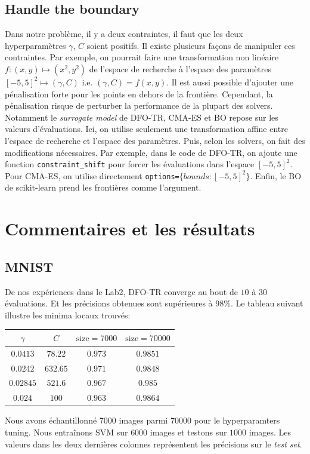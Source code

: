 \documentclass[12 pt, a4paper]{article}
\begin{document}
\subsection{Handle the boundary}
Dans notre problème, il y a deux contraintes, il faut que les deux hyperparamètres $\gamma$, $C$ soient positifs. Il existe plusieurs façons de manipuler ces contraintes. Par exemple, on pourrait faire une transformation non linéaire $f:(x,y) \mapsto (x^2, y^2)$ de l'espace de recherche à l'espace des paramètres $[-5, 5]^2 \mapsto (\gamma, C)$ i.e. $(\gamma, C) = f(x,y)$. Il est aussi possible d'ajouter une pénalisation forte pour les points en dehors de la frontière. Cependant, la pénalisation risque de perturber la performance de la plupart des solvers. Notamment le \textit{surrogate model} de DFO-TR, CMA-ES et BO repose sur les valeurs d'évaluations. Ici, on utilise seulement une transformation affine entre l'espace de recherche et l'espace des paramètres. Puis, selon les solvers, on fait des modifications nécessaires. Par exemple, dans le code de DFO-TR, on ajoute une fonction \texttt{constraint\_shift} pour forcer les évaluations dans l'espace $[-5,5]^2$. Pour CMA-ES, on utilise directement \texttt{options=$\{bounds: [-5,5]^2\}$}. Enfin, le BO de scikit-learn prend les frontières comme l'argument.







\section{Commentaires et les résultats}\label{results}

\subsection{MNIST}

De nos expériences dans le Lab2, DFO-TR converge au bout de $10$ à $30$ évaluations. Et les précisions obtenues sont supérieures à $98\%$. Le tableau suivant illustre les minima locaux trouvés:

\begin{center}
\begin{tabular}{|c|c|c|c|}
  \hline
  $\gamma$ & $C$ & $\text{size}=7000$ & $\text{size}=70000$ \\
  \hline
  $0.0413$ & $78.22$ & $0.973$ & $0.9851$ \\
  $0.0242$ & $632.65$ & $0.971$ & $0.9848$ \\
  $0.02845$ & $521.6$ & $0.967$ & $0.985$ \\
  $0.024$ & $100$ & $0.963$ & $0.9864$ \\
  \hline
\end{tabular}
\end{center}
Nous avons échantillonné $7000$ images parmi $70000$ pour le hyperparamters tuning. Nous entraînons SVM sur $6000$ images et testons sur $1000$ images. Les valeurs dans les deux dernières colonnes représentent les précisions sur le \emph{test set}.
\end{document}
